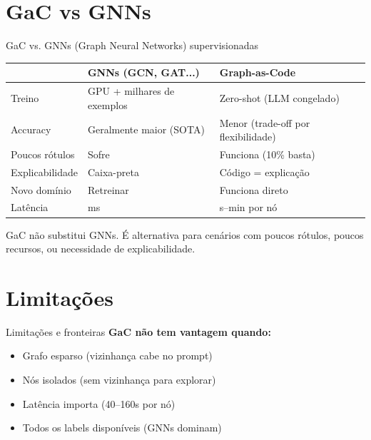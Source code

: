 \documentclass{beamer}
\begin{document}
\section*{GaC vs GNNs}
\begin{frame}{GaC vs. GNNs (Graph Neural Networks) supervisionadas}
  \begin{table}
    \centering
    \footnotesize
    \begin{tabular}{p{2.8cm}p{4.5cm}p{4.5cm}}
      \toprule
      & \textbf{GNNs (GCN, GAT...)} & \textbf{Graph-as-Code} \\
      \midrule
      Treino & GPU + milhares de exemplos & Zero-shot (LLM congelado) \\
      Accuracy & Geralmente maior (SOTA) & Menor (trade-off por flexibilidade) \\
      Poucos rótulos & Sofre & Funciona (10\% basta) \\
      Explicabilidade & Caixa-preta & Código = explicação \\
      Novo domínio & Retreinar & Funciona direto \\
      Latência & ms & s--min por nó \\
      \bottomrule
    \end{tabular}
  \end{table}

  \vspace{0.3em}
  GaC não substitui GNNs. É alternativa para cenários com poucos rótulos, poucos recursos, ou necessidade de explicabilidade.
\end{frame}

\section*{Limitações}
\begin{frame}{Limitações e fronteiras}
  \textbf{GaC não tem vantagem quando:}
  \begin{itemize}
    \item Grafo esparso (vizinhança cabe no prompt)
    \item Nós isolados (sem vizinhança para explorar)
    \item Latência importa (40--160s por nó)
    \item Todos os labels disponíveis (GNNs dominam)
  \end{itemize}

\end{frame}
\end{document}
